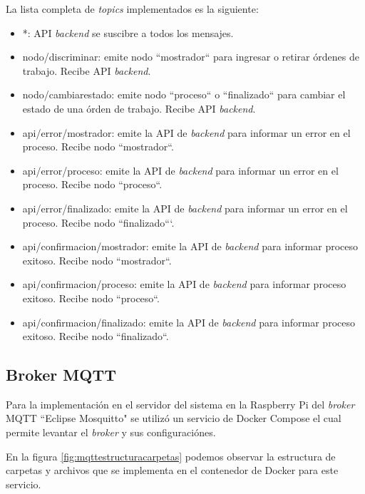La lista completa de \textit{topics} implementados es la siguiente:
\begin{itemize}
\item *: API \textit{backend} se suscibre a todos los mensajes.
\item nodo/discriminar: emite nodo ``mostrador`` para ingresar o retirar órdenes de trabajo. Recibe API \textit{backend}.
\item nodo/cambiarestado: emite nodo ``proceso`` o ``finalizado`` para cambiar el estado de una órden de trabajo. Recibe API \textit{backend}.
\item api/error/mostrador: emite la API de \textit{backend} para informar un error en el proceso. Recibe nodo ``mostrador``.
\item api/error/proceso: emite la API de \textit{backend} para informar un error en el proceso. Recibe nodo ``proceso``.
\item api/error/finalizado: emite la API de \textit{backend} para informar un error en el proceso. Recibe nodo ``finalizado```.
\item api/confirmacion/mostrador: emite la API de \textit{backend} para informar proceso exitoso. Recibe nodo ``mostrador``.
\item api/confirmacion/proceso: emite la API de \textit{backend} para informar proceso exitoso. Recibe nodo ``proceso``.
\item api/confirmacion/finalizado: emite la API de \textit{backend} para informar proceso exitoso. Recibe nodo ``finalizado``.

\end{itemize}

\subsection{Broker MQTT}
\label{subsec:mqttbroker}

Para la implementación en el servidor del sistema en la Raspberry Pi del \textit{broker} MQTT ``Eclipse Mosquitto" se utilizó un servicio de Docker Compose el cual permite levantar el \textit{broker} y sus configuraciónes.

En la figura \ref{fig:mqttestructuracarpetas} podemos observar la estructura de carpetas y archivos que se implementa en el contenedor de Docker para este servicio. 

